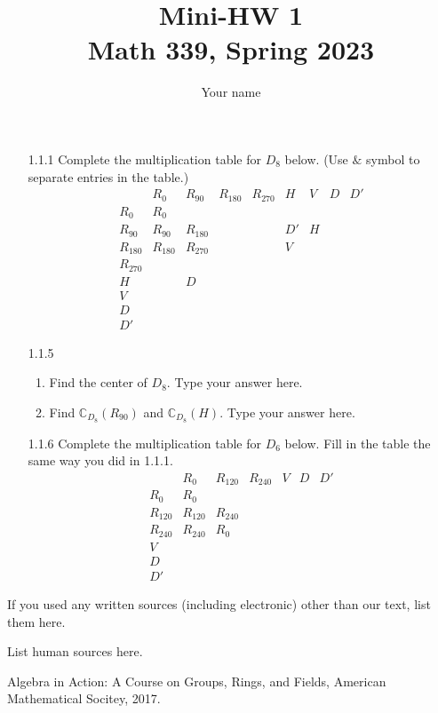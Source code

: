 \documentclass[12pt]{amsart}
\newcommand{\CC}{\ensuremath{\mathbb{C}}}
\theoremstyle{definition}
\begin{document}
\title{Mini-HW 1\\Math 339, Spring 2023}
\author{Your name}

\maketitle


\begin{enumerate}
\item[1.1.1]  Complete the multiplication table for $D_8$ below.  (Use $\&$ symbol to separate entries in the table.)
\[\begin{array}{c|cccccccc}
&R_0 & R_{90} & R_{180} & R_{270} & H & V & D & D'\\
\hline
R_0 & R_0\\
R_{90} & R_{90} & R_{180} & & & D' & H\\
R_{180} & R_{180} & R_{270} & & & V\\
R_{270}\\
H & & D\\
V\\
D\\
D'

\end{array}
\]
\item[1.1.5]
\begin{enumerate}
\item Find the center of $D_8.$  Type your answer here.
\item Find $\CC_{D_8}(R_{90})$ and $\CC_{D_8}(H)$.  Type your answer here.
\end{enumerate}

\item[1.1.6]  Complete the multiplication table for $D_6$ below.  Fill in the table the same way you did in 1.1.1.
\[\begin{array}{c|cccccc}
&R_0 & R_{120} & R_{240} &V & D& D' \\
\hline
R_0 & R_0\\
R_{120} & R_{120} & R_{240} & \\
R_{240} & R_{240} & R_0 & \\
V\\
D\\
D'

\end{array}
\]

\end{enumerate}

\begin{thebibliography}{99}
 If you used any written sources (including electronic) other than our text, list them here.

  List human sources here.

  Algebra in Action: A Course on Groups, Rings, and Fields, American Mathematical Socitey, 2017.
\end{thebibliography}
\end{document}
